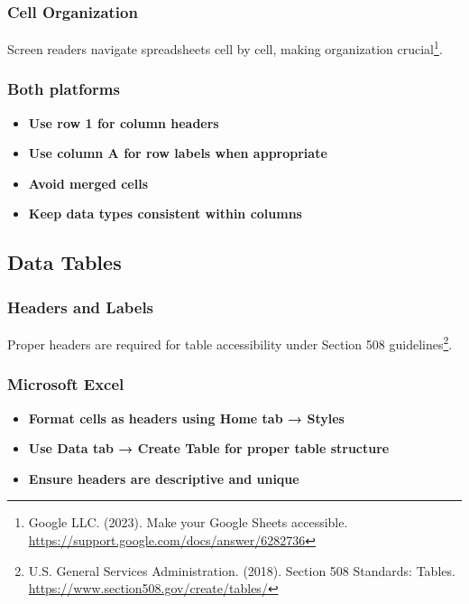 \subsubsection{Cell Organization}
Screen readers navigate spreadsheets cell by cell, making organization crucial\footnote{Google LLC. (2023). Make your Google Sheets accessible. \url{https://support.google.com/docs/answer/6282736}}.

\subsubsection{Both platforms}
\vspace{1em}
\begin{itemize}
\item \textbf{Use row 1 for column headers}
\item \textbf{Use column A for row labels when appropriate}
\item \textbf{Avoid merged cells}
\item \textbf{Keep data types consistent within columns}
\end{itemize}
\vspace{1em}

\subsection{Data Tables}

\subsubsection{Headers and Labels}
Proper headers are required for table accessibility under Section 508 guidelines\footnote{U.S. General Services Administration. (2018). Section 508 Standards: Tables. \url{https://www.section508.gov/create/tables/}}.

\subsubsection{Microsoft Excel}
\vspace{1em}
\begin{itemize}
\item \textbf{Format cells as headers using Home tab → Styles}
\item \textbf{Use Data tab → Create Table for proper table structure}
\item \textbf{Ensure headers are descriptive and unique}
\end{itemize}
\vspace{1em}

